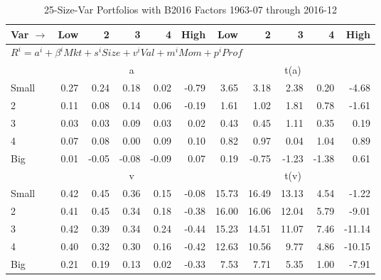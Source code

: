 
\begin{table}[!ht]
\footnotesize
\centering
\caption{25-Size-Var Portfolios with B2016 Factors 1963-07 through 2016-12}
\begin{tabular}{lrrrrrrrrrr}
  \toprule
    Var $\rightarrow$ & Low & 2 & 3 & 4 & High & Low & 2 & 3 & 4 & High \\ 
  \midrule
  \multicolumn{11}{l}{$R^i=a^i+\beta^iMkt+s^iSize+v^iVal+m^iMom+p^iProf$} \\

  
    
      & \multicolumn{5}{c}{a} & \multicolumn{5}{c}{t(a)}
    
    \\
      \cmidrule(r){2-6} \cmidrule(r){7-11}

    Small   & 0.27  & 0.24  & 0.18  & 0.02  & -0.79  & 3.65  & 3.18  & 2.38  & 0.20  & -4.68  \\
         2  & 0.11  & 0.08  & 0.14  & 0.06  & -0.19  & 1.61  & 1.02  & 1.81  & 0.78  & -1.61  \\
         3  & 0.03  & 0.03  & 0.09  & 0.03  & 0.02  & 0.43  & 0.45  & 1.11  & 0.35  & 0.19  \\
         4  & 0.07  & 0.08  & 0.00  & 0.09  & 0.10  & 0.82  & 0.97  & 0.04  & 1.04  & 0.89  \\
    Big     & 0.01  & -0.05  & -0.08  & -0.09  & 0.07  & 0.19  & -0.75  & -1.23  & -1.38  & 0.61  \\

  
    
      & \multicolumn{5}{c}{v} & \multicolumn{5}{c}{t(v)}
    
    \\
      \cmidrule(r){2-6} \cmidrule(r){7-11}

    Small   & 0.42  & 0.45  & 0.36  & 0.15  & -0.08  & 15.73  & 16.49  & 13.13  & 4.54  & -1.22  \\
         2  & 0.41  & 0.45  & 0.34  & 0.18  & -0.38  & 16.00  & 16.06  & 12.04  & 5.79  & -9.01  \\
         3  & 0.42  & 0.39  & 0.34  & 0.24  & -0.44  & 15.23  & 14.51  & 11.07  & 7.46  & -11.14  \\
         4  & 0.40  & 0.32  & 0.30  & 0.16  & -0.42  & 12.63  & 10.56  & 9.77  & 4.86  & -10.15  \\
    Big     & 0.21  & 0.19  & 0.13  & 0.02  & -0.33  & 7.53  & 7.71  & 5.35  & 1.00  & -7.91  \\

  
    

\end{tabular}
\end{table}
